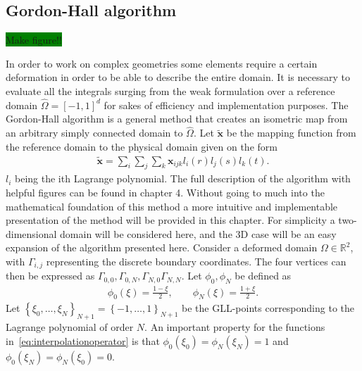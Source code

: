 
\subsection{Gordon-Hall algorithm} \label{GH}
\colorbox{green}{Make figure!!}


In order to work on complex geometries some elements require a certain deformation in order to be able 
to describe the entire domain. It is necessary to evaluate all the integrals surging from the weak formulation over 
a reference domain $\hat{\Omega} = [-1,1]^d$ for sakes of efficiency and implementation purposes. The Gordon-Hall 
algorithm is a general method that creates an isometric map from an arbitrary simply connected domain to $\hat{\Omega}$.
Let $\mathbf{\tilde{x}}$ be the mapping function from the reference domain to the physical domain given on the form 
%
\begin{align}
    \mathbf{\tilde{x}}= \sum_i \sum_j \sum_k \mathbf{x}_{ijk}l_i(r) l_j(s) l_k(t).
    \label{eq:mapping}
\end{align}
%
$l_i$ being the ith Lagrange polynomial.
The full description of the algorithm with helpful figures can be found in \cite{Deville} chapter 4.
Without going to much into the mathematical foundation of this method a more intuitive and implementable
presentation of the method will be provided in this chapter. 
For simplicity a two-dimensional domain will be considered here, and the 3D case will be an easy expansion 
of the algorithm presented here. Consider a deformed domain $\Omega \in \mathbb{R}^2$, with $\Gamma_{i,j}$ representing 
the discrete boundary coordinates. The four vertices can then be expressed as 
$\Gamma_{0,0},\Gamma_{0,N},\Gamma_{N,0}\Gamma_{N,N}$. Let $\phi_0,\phi_N$ be defined as 
%
\begin{align}
    \phi_0(\xi) = \frac{1-\xi}{2}, \qquad
    \phi_N(\xi) = \frac{1+\xi}{2}.
    \label{eq:interpolationoperator}
\end{align}
%
Let $\left\{ \xi_0, \ldots ,\xi_N \right\}_{N+1} = \left\{ -1 ,\ldots ,1 \right\}_{N+1}$
be the GLL-points corresponding to the Lagrange polynomial of order $N$. 
An important property for the functions in~\ref{eq:interpolationoperator} is that
$\phi_0(\xi_0) =\phi_N(\xi_N) = 1$ and $\phi_0(\xi_N) =\phi_N(\xi_0) = 0$.

